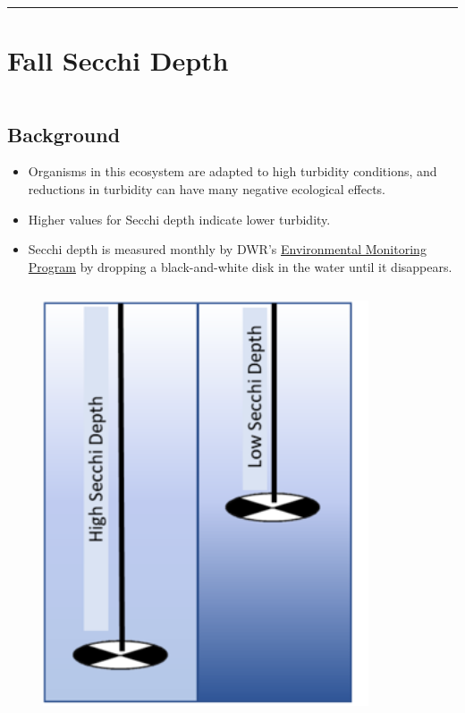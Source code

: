 \documentclass[
]{book}
\providecommand{\tightlist}{%
  \setlength{\itemsep}{0pt}\setlength{\parskip}{0pt}}
\begin{document}
\begin{center}\rule{0.5\linewidth}{0.5pt}\end{center}

\hypertarget{fall-secchi-depth}{%
\section{Fall Secchi Depth}\label{fall-secchi-depth}}

\begin{columns-nocenter}

\begin{column}

\hypertarget{background}{%
\subsection{Background}\label{background}}

\begin{itemize}
\tightlist
\item
  Organisms in this ecosystem are adapted to high turbidity conditions, and reductions in turbidity can have many negative ecological effects.
\item
  Higher values for Secchi depth indicate lower turbidity.
\item
  Secchi depth is measured monthly by DWR's \href{https://emp.baydeltalive.com/wiki/12297}{Environmental Monitoring Program} by dropping a black-and-white disk in the water until it disappears.
\end{itemize}

\end{column}

\begin{column}

\begin{figure}

{\centering \includegraphics[width=3.79in]{figures/secchidisc} 

}
\end{figure}
\end{column}
\end{columns-nocenter}
\end{document}
